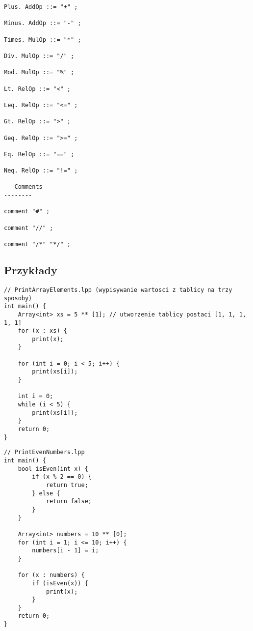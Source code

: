 \documentclass[a4paper]{article}
\begin{document}
\begin{lstlisting}
Plus. AddOp ::= "+" ;

Minus. AddOp ::= "-" ;

Times. MulOp ::= "*" ;

Div. MulOp ::= "/" ;

Mod. MulOp ::= "%" ;

Lt. RelOp ::= "<" ;

Leq. RelOp ::= "<=" ;

Gt. RelOp ::= ">" ;

Geq. RelOp ::= ">=" ;

Eq. RelOp ::= "==" ;
    
Neq. RelOp ::= "!=" ;

-- Comments ------------------------------------------------------------------

comment "#" ;

comment "//" ;

comment "/*" "*/" ;
\end{lstlisting}

\subsection*{Przykłady}

\begin{lstlisting}
// PrintArrayElements.lpp (wypisywanie wartosci z tablicy na trzy sposoby)
int main() {
    Array<int> xs = 5 ** [1]; // utworzenie tablicy postaci [1, 1, 1, 1, 1]
    for (x : xs) {
        print(x);
    }

    for (int i = 0; i < 5; i++) {
        print(xs[i]);
    }

    int i = 0;
    while (i < 5) {
        print(xs[i]);
    }
    return 0;
}
\end{lstlisting}

\begin{lstlisting}
// PrintEvenNumbers.lpp
int main() {
    bool isEven(int x) {
        if (x % 2 == 0) {
            return true;
        } else {
            return false;
        } 
    }

    Array<int> numbers = 10 ** [0];
    for (int i = 1; i <= 10; i++) {
        numbers[i - 1] = i;
    }

    for (x : numbers) {
        if (isEven(x)) {
            print(x);
        }
    }
    return 0;
}
\end{lstlisting}
\end{document}
